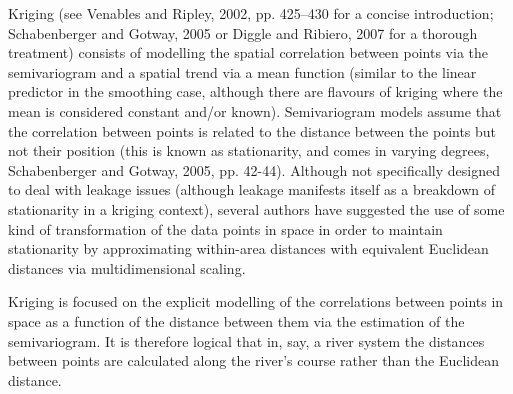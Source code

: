 \documentclass[useAMS, referee]{biom}
\begin{document}
Kriging  (see Venables and Ripley, 2002, pp. 425--430 for a concise introduction; Schabenberger and Gotway, 2005 or Diggle and Ribiero, 2007 for a thorough treatment) consists of modelling the spatial correlation between points via the semivariogram and a spatial trend via a mean function (similar to the linear predictor in the smoothing case, although there are flavours of kriging where the mean is considered constant and/or known). Semivariogram models assume that the correlation between points is related to the distance between the points but not their position (this is known as stationarity, and comes in varying degrees, Schabenberger and Gotway, 2005, pp. 42-44). Although not specifically designed to deal with leakage issues (although leakage manifests itself as a breakdown of stationarity in a kriging context), several authors have suggested the use of some kind of transformation of the data points in space in order to maintain stationarity by approximating within-area distances with equivalent Euclidean distances via multidimensional scaling.

Kriging is focused on the explicit modelling of the correlations between points in space as a function of the distance between them via the estimation of the semivariogram. It is therefore logical that in, say, a river system the distances between points are calculated along the river's course rather than the Euclidean distance. 
\end{document}
